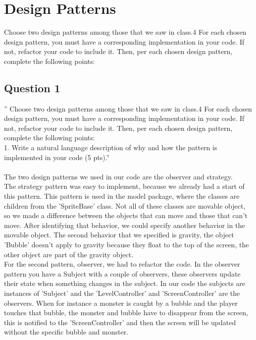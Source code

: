 \chapter{Design Patterns}

Choose two design patterns among those that we saw in class.4 For each chosen design pattern, you must have a corresponding implementation in your code. If not, refactor your code to include it. Then, per each chosen design pattern, complete the following points:

\section{Question 1}

'' Choose two design patterns among those that we saw in class.4 For each chosen design pattern, you must
have a corresponding implementation in your code. If not, refactor your code to include it. Then, per each
chosen design pattern, complete the following points:\\
1. Write a natural language description of why and how the pattern is implemented in your code (5 pts).''
\\
\\
The two design patterns we used in our code are the observer and strategy.\\ The strategy pattern was easy to implement, because we already had a start of this pattern. This pattern is used in the model package, where the classes are children from the 'SpriteBase' class. Not all of these classes are movable object, so we made a difference between the objects that can move and those that can't move. After identifying that behavior, we could specify another behavior in the movable object. The second behavior that we specified is gravity, the object 'Bubble' doesn't apply to gravity because they float to the top of the screen, the other object are part of the gravity object.\\
For the second pattern, observer, we had to refactor the code. In the observer pattern you have a Subject with a couple of observers, these observers update their state when something changes in the subject. In our code the subjects are instances of 'Subject' and the 'LevelController' and 'ScreenController' are the observers. When for instance a monster is caught by a bubble and the player touches that bubble, the monster and bubble have to disappear from the screen, this is notified to the 'ScreenController' and then the screen will be updated without the specific bubble and monster.
